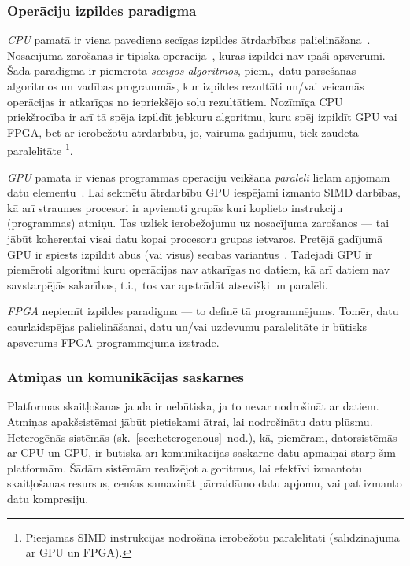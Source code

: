 \subsubsection*{Operāciju izpildes paradigma}
\emph{CPU} pamatā ir viena pavediena secīgas izpildes ātrdarbības
palielināšana~\cite{Owens-GPU}.
Nosacījuma zarošanās ir tipiska operācija~\cite{Flynn-arch}\cite{Patterson},
kuras izpildei nav īpaši apsvērumi.
Šāda paradigma ir piemērota \emph{secīgos algoritmos},
piem.,~datu parsēšanas algoritmos un vadības programmās,
kur izpildes rezultāti un/vai veicamās operācijas ir atkarīgas
no iepriekšējo soļu rezultātiem. Nozīmīga CPU priekšrocība ir arī tā spēja
izpildīt jebkuru algoritmu, kuru spēj izpildīt GPU vai FPGA, bet ar
ierobežotu ātrdarbību, jo, vairumā gadījumu, tiek zaudēta paralelitāte%
\footnote{Pieejamās SIMD instrukcijas nodrošina
	ierobežotu paralelitāti (salīdzinājumā ar GPU un FPGA).}.

\emph{GPU} pamatā ir vienas programmas operāciju veikšana \emph{paralēli}
lielam apjomam
datu elementu~\cite{Fatahalian}\cite{Owens-GPU}.
Lai sekmētu ātrdarbību GPU iespējami izmanto SIMD darbības,
kā arī straumes procesori ir apvienoti grupās kuri koplieto instrukciju
(programmas) atmiņu. Tas uzliek ierobežojumu uz nosacījuma zarošanos ---
tai jābūt koherentai visai datu kopai procesoru grupas ietvaros. Pretējā
gadījumā GPU ir spiests izpildīt abus (vai visus) secības variantus~\cite{Owens-GPU}.
Tādējādi GPU ir piemēroti algoritmi kuru operācijas nav atkarīgas no datiem,
kā arī datiem nav savstarpējās sakarības, t.i.,~tos var apstrādāt atsevišķi
un paralēli.

\emph{FPGA} nepiemīt izpildes paradigma --- to definē tā programmējums.
Tomēr, datu caurlaidspējas palielināšanai,
datu un/vai uzdevumu paralelitāte ir būtisks apsvērums
FPGA programmējuma izstrādē.

\subsubsection*{Atmiņas un komunikācijas saskarnes}
Platformas skaitļošanas jauda ir nebūtiska, ja to nevar nodrošināt ar datiem.
Atmiņas apakšsistēmai jābūt pietiekami ātrai, lai nodrošinātu datu plūsmu.
Heterogēnās sistēmās (sk.~\ref{sec:heterogenous}~nod.), kā, piemēram,
datorsistēmās ar CPU un GPU, ir būtiska arī komunikācijas saskarne datu
apmaiņai starp šīm platformām. Šādām sistēmām realizējot algoritmus,
lai efektīvi izmantotu skaitļošanas resursus, cenšas samazināt pārraidāmo
datu apjomu, vai pat izmanto datu kompresiju.
\cite{ACDA}\cite{OpenCL-book}

